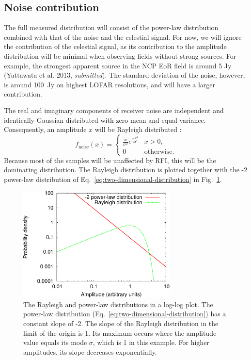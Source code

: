 \documentclass[useAMS,usenatbib]{mn2e}
\begin{document}
\subsection{Noise contribution} \label{sec:histogram-noise}
The full measured distribution will consist of the power-law distribution combined with that of the noise and the celestial signal. For now, we will ignore the contribution of the celestial signal, as its contribution to the amplitude distribution will be minimal when observing fields without strong sources. For example, the strongest apparent source in the NCP EoR field is around 5 Jy (Yattawata et al. 2013, \textit{submitted}). %
The standard deviation of the noise, however, is around 100~Jy on highest LOFAR resolutions, and will have a larger contribution.

The real and imaginary components of receiver noise are independent and identically Gaussian distributed with zero mean and equal variance. Consequently, an amplitude $x$ will be Rayleigh distributed \citep[\S6-2]{papoulis-stochastic-processes}: 
\begin{equation}\label{eq:rayleigh-formula}
f_\textrm{noise}(x) =
\begin{cases}
\frac{x}{\sigma^2} e^{\frac{-x^2}{2\sigma^2}} & x > 0, \\
0 & \textrm{otherwise.}
\end{cases}
\end{equation}
Because most of the samples will be unaffected by RFI, this will be the dominating distribution. The Rayleigh distribution is plotted together with the -2 power-law distribution of Eq.~\eqref{eq:two-dimensional-distribution} in Fig.~\ref{fig:rayleigh-and-rfi-distributions}.

\begin{figure}
\begin{center}\hspace{-5mm}\includegraphics[width=8cm]{img/plot-rayleigh-and-rfi-trimmed}
\caption{The Rayleigh and power-law distributions in a log-log plot. The power-law distribution (Eq.~\eqref{eq:two-dimensional-distribution}) has a constant slope of -2. The slope of the Rayleigh distribution in the limit of the origin is 1. Its maximum occurs where the amplitude value equals its mode $\sigma$, which is 1 in this example. For higher amplitudes, its slope decreases exponentially.}
\label{fig:rayleigh-and-rfi-distributions}
\end{center}
\end{figure}
\end{document}
